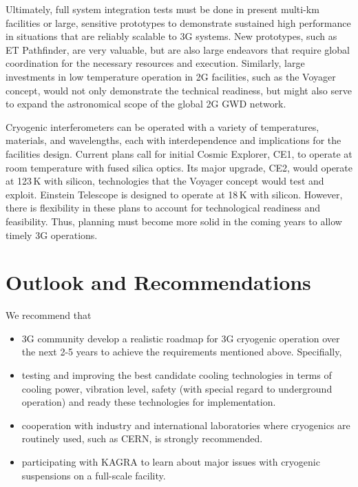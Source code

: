 Ultimately, full system integration tests must be done in present multi-km facilities or large, sensitive prototypes to demonstrate sustained high performance in situations that are reliably scalable to \ac{3G} systems. New prototypes, such as ET Pathfinder, are very valuable, but are also large endeavors that require global coordination for the necessary resources and execution. Similarly, large investments in low temperature operation in 2G facilities, such as the \ac{Voyager} concept, would not only demonstrate the technical readiness, but might also serve to expand the astronomical scope of the global 2G \ac{GWD} network. 



Cryogenic interferometers can be operated with a variety of temperatures, materials, and wavelengths, each with interdependence and implications for the facilities design. Current plans call for initial Cosmic Explorer, \ac{CE1}, to operate at room temperature with fused silica optics. Its major upgrade, \ac{CE2}, would operate at 123\,K with silicon, technologies that the Voyager concept would test and exploit. Einstein Telescope is designed to operate at 18\,K with silicon. However, there is flexibility in these plans to account for technological readiness and feasibility. Thus, planning must become more solid in the coming years to allow timely \ac{3G} operations. 

\section{Outlook and Recommendations}
We recommend that 
\begin{itemize}
\item \ac{3G} community develop a realistic roadmap for \ac{3G} cryogenic operation over the next 2-5 years to achieve the requirements mentioned above.  Specifially,
\item testing and improving the best candidate cooling technologies in terms of cooling power, vibration level, safety (with special regard to underground operation) and ready these technologies for implementation. 
\item  cooperation with industry and international laboratories where cryogenics are routinely used, such as \ac{CERN}, is strongly recommended. 
\item participating with \ac{KAGRA} to learn about major issues with cryogenic suspensions  on a full-scale facility.
\end{itemize}


